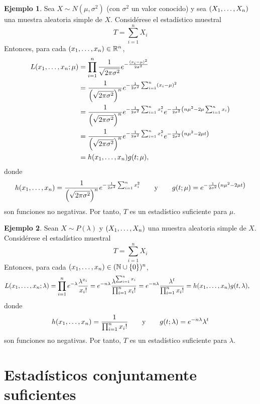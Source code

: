 \documentclass[11pt]{report}
\theoremstyle{definition}
\newtheorem{example}{Ejemplo}
\newcommand{\R}{\mathbb R}
\newcommand{\N}{\mathbb N}
\begin{document}
\begin{example}
Sea $X \sim N(\mu,\sigma^2)$ (con $\sigma^2$ un valor conocido) y sea $(X_1,\mathellipsis,X_n)$ una muestra aleatoria simple de $X$. Considérese el estadístico muestral
\[T= \sum_{i=1}^n X_i\]
Entonces, para cada $(x_1,\mathellipsis,x_n) \in \R^n$,
\[
\begin{aligned}[t]
L(x_1,\mathellipsis,x_n;\mu) &=\prod_{i=1}^n\frac{1}{\sqrt{2\pi\sigma^2}}e^{-\frac{(x_i-\mu)^2}{2\sigma^2}} 
\\ &= \frac{1}{\left(\sqrt{2\pi\sigma^2}\right)^n}e^{-\frac{1}{2\sigma^2}\sum_{i=1}^n (x_i-\mu)^2} \\ &= \frac{1}{\left(\sqrt{2\pi\sigma^2}\right)^n}e^{-\frac{1}{2\sigma^2}\sum_{i=1}^n x_i^2}e^{-\frac{1}{2\sigma^2}\left(n\mu^2-2\mu\sum_{i=1}^n x_i\right)} \\
&= \frac{1}{\left(\sqrt{2\pi\sigma^2}\right)^n}e^{-\frac{1}{2\sigma^2}\sum_{i=1}^n x_i^2}e^{-\frac{1}{2\sigma^2}\left(n\mu^2-2\mu t\right)} \\
&= h(x_1,\mathellipsis,x_n)g(t;\mu),
\end{aligned}
\]
donde
\[h(x_1,\mathellipsis,x_n) = \frac{1}{\left(\sqrt{2\pi\sigma^2}\right)^n}e^{-\frac{1}{2\sigma^2}\sum_{i=1}^n x_i^2} \qquad \textup{y} \qquad g(t;\mu) = e^{-\frac{1}{2\sigma^2}\left(n\mu^2-2\mu t\right)} \]
son funciones no negativas. Por tanto, $T$ es un estadístico suficiente para $\mu$.
\end{example}

\begin{example}
Sean $X \sim P(\lambda)$ y $(X_1,\mathellipsis,X_n)$ una muestra aleatoria simple de $X$. Considérese el estadístico muestral
\[T = \sum_{i=1}^n X_i\]
Entonces, para cada $(x_1,\mathellipsis,x_n) \in (\N \cup \{0\})^n$,
\[
\begin{aligned}[t]
L(x_1,\mathellipsis,x_n;\lambda) &= \prod_{i=1}^n e^{-\lambda}\frac{\lambda^{x_i}}{x_i!} = e^{-n\lambda}\frac{\lambda^{\sum_{i=1}^n x_i}}{\prod_{i=1}^n x_i!} =e^{-n\lambda}\frac{\lambda^{t}}{\prod_{i=1}^n x_i!} = h(x_1,\mathellipsis,x_n)g(t,\lambda),
\end{aligned}
\]
donde
\[h(x_1,\mathellipsis,x_n) =\frac{1}{\prod_{i=1}^n x_i!} \qquad \textup{y} \qquad g(t;\lambda) = e^{-n\lambda}\lambda^t\]
son funciones no negativas. Por tanto, $T$ es un estadístico suficiente para $\lambda$.
\end{example}

\section{Estadísticos conjuntamente suficientes}
\end{document}
